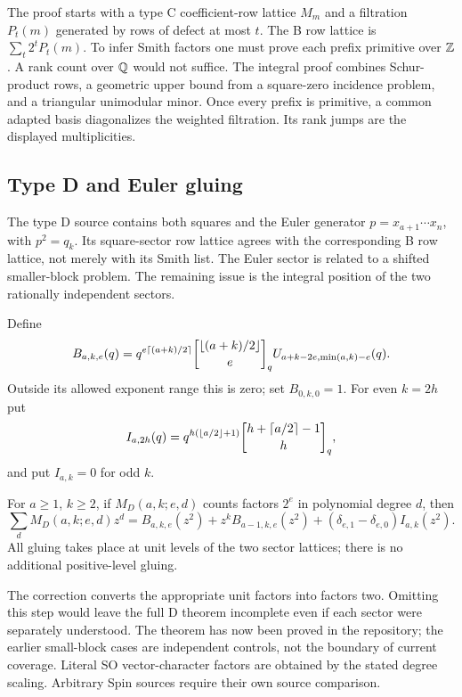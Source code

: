 The proof starts with a type C coefficient-row lattice $M_m$ and a filtration $P_t(m)$ generated by rows of defect at most $t$. The B row lattice is $\sum_t2^tP_t(m)$. To infer Smith factors one must prove each prefix primitive over $\mathbb Z$. A rank count over $\mathbb Q$ would not suffice. The integral proof combines Schur-product rows, a geometric upper bound from a square-zero incidence problem, and a triangular unimodular minor. Once every prefix is primitive, a common adapted basis diagonalizes the weighted filtration. Its rank jumps are the displayed multiplicities.

\subsection{Type D and Euler gluing}
The type D source contains both squares and the Euler generator $p=x_{a+1}\cdots x_n$, with $p^2=q_k$. Its square-sector row lattice agrees with the corresponding B row lattice, not merely with its Smith list. The Euler sector is related to a shifted smaller-block problem. The remaining issue is the integral position of the two rationally independent sectors.

Define
\[
 B_{a,k,e}(q)=q^{e\lceil(a+k)/2\rceil}
 \gb{\lfloor(a+k)/2\rfloor}{e}
 U_{a+k-2e,\min(a,k)-e}(q).
\]
Outside its allowed exponent range this is zero; set $B_{0,k,0}=1$. For even $k=2h$ put
\[
 I_{a,2h}(q)=q^{h(\lfloor a/2\rfloor+1)}
 \gb{h+\lceil a/2\rceil-1}{h},
\]
and put $I_{a,k}=0$ for odd $k$.
\begin{theorem}
For $a\ge1$, $k\ge2$, if $M_D(a,k;e,d)$ counts factors $2^e$ in polynomial degree $d$, then
\[
 \sum_d M_D(a,k;e,d)z^d
 =B_{a,k,e}(z^2)+z^kB_{a-1,k,e}(z^2)
 +(\delta_{e,1}-\delta_{e,0})I_{a,k}(z^2).
\]
All gluing takes place at unit levels of the two sector lattices; there is no additional positive-level gluing.
\end{theorem}
The correction converts the appropriate unit factors into factors two. Omitting this step would leave the full D theorem incomplete even if each sector were separately understood. The theorem has now been proved in the repository; the earlier small-block cases are independent controls, not the boundary of current coverage. Literal SO vector-character factors are obtained by the stated degree scaling. Arbitrary Spin sources require their own source comparison.


